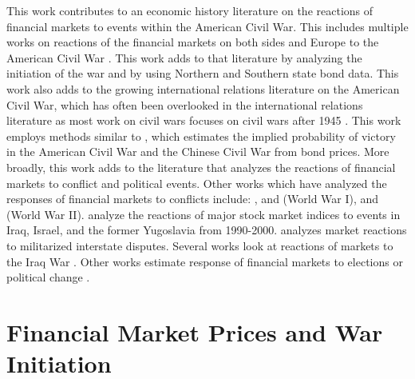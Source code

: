 This work contributes to an economic history literature on the reactions of financial markets to events within the American Civil War.
This includes multiple works on reactions of the financial markets on both sides and Europe to the American Civil War \parencites{Schwab1901}{Mitchell1903}{WillardGuinnaneEtAl1996}{McCandless1996}{SmithSmith1997}{BrownBurdekin2000}{Weidenmier2002}.
This work adds to that literature by analyzing the initiation of the war and by using Northern and Southern state bond data.
This work also adds to the growing international relations literature on the American Civil War, which has often been overlooked in the international relations literature as most work on civil wars focuses on civil wars after 1945 \parencites{Poast2012}{Reiter2009}.
This work employs methods similar to \textcite{HaberMitchenerOosterlinckEtAl2015}, which estimates the implied probability of victory in the American Civil War and the Chinese Civil War from bond prices.
More broadly, this work adds to the literature that analyzes the reactions of financial markets to conflict and political events.
Other works which have analyzed the responses of financial markets to conflicts include: \textcite{Bueno1990}, \textcite{Hall2004} and \textcite{Ferguson2006} (World War I), and \textcites{WaldenstromFrey2008}{WaldenstromFrey2008} (World War II).
\textcite{SchneiderTroeger2006} analyze the reactions of major stock market indices to events in Iraq, Israel, and the former Yugoslavia from 1990-2000.
\textcite{GuidolinLaFerrara2010} analyzes market reactions to militarized interstate disputes.
Several works look at reactions of markets to the Iraq War \parencites{RigobonSack2005}{LeighWolfersEtAl2003}{WolfersZitzewitz2009}.
Other works estimate response of financial markets to elections or political change \parencites{Jayachandr2006}{Herron2000}.

\section{Financial Market Prices and War Initiation}
\label{acw_onset:sec:risky-bond-pricing}

